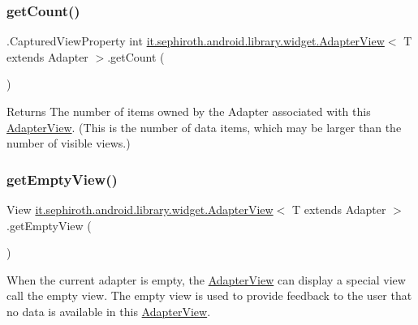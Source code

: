 \subsubsection{\texorpdfstring{get\+Count()}{getCount()}}
{\footnotesize\ttfamily .Captured\+View\+Property int \hyperlink{classit_1_1sephiroth_1_1android_1_1library_1_1widget_1_1_adapter_view}{it.\+sephiroth.\+android.\+library.\+widget.\+Adapter\+View}$<$ T extends Adapter $>$.get\+Count (\begin{DoxyParamCaption}{ }\end{DoxyParamCaption})}

\begin{DoxyReturn}{Returns}
The number of items owned by the Adapter associated with this \hyperlink{classit_1_1sephiroth_1_1android_1_1library_1_1widget_1_1_adapter_view}{Adapter\+View}. (This is the number of data items, which may be larger than the number of visible views.) 
\end{DoxyReturn}
\mbox{\label{classit_1_1sephiroth_1_1android_1_1library_1_1widget_1_1_adapter_view_a5fd13413bb6259fc3d1974db798a4a13}} 
\subsubsection{\texorpdfstring{get\+Empty\+View()}{getEmptyView()}}
{\footnotesize\ttfamily View \hyperlink{classit_1_1sephiroth_1_1android_1_1library_1_1widget_1_1_adapter_view}{it.\+sephiroth.\+android.\+library.\+widget.\+Adapter\+View}$<$ T extends Adapter $>$.get\+Empty\+View (\begin{DoxyParamCaption}{ }\end{DoxyParamCaption})}

When the current adapter is empty, the \hyperlink{classit_1_1sephiroth_1_1android_1_1library_1_1widget_1_1_adapter_view}{Adapter\+View} can display a special view call the empty view. The empty view is used to provide feedback to the user that no data is available in this \hyperlink{classit_1_1sephiroth_1_1android_1_1library_1_1widget_1_1_adapter_view}{Adapter\+View}.

